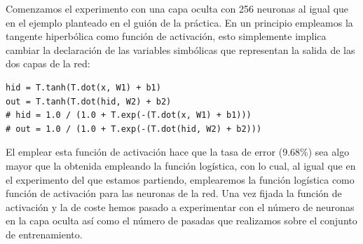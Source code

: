\documentclass[10pt,a4paper]{article}
\begin{document}
Comenzamos el experimento con una capa oculta con 256 neuronas al igual que en el ejemplo planteado en el guión de la práctica. En un principio empleamos la tangente hiperbólica como función de activación, esto simplemente implica cambiar la declaración de las variables simbólicas que representan la salida de las dos capas de la red:

\begin{lstlisting}
hid = T.tanh(T.dot(x, W1) + b1)
out = T.tanh(T.dot(hid, W2) + b2)
# hid = 1.0 / (1.0 + T.exp(-(T.dot(x, W1) + b1)))
# out = 1.0 / (1.0 + T.exp(-(T.dot(hid, W2) + b2)))
\end{lstlisting}

El emplear esta función de activación hace que la tasa de error (9.68\%) sea algo mayor que la obtenida empleando la función logística, con lo cual, al igual que en el experimento del que estamos partiendo, emplearemos la función logística como función de activación para las neuronas de la red. Una vez fijada la función de activación y la de coste hemos pasado a experimentar con el número de neuronas en la capa oculta así como el número de pasadas que realizamos sobre el conjunto de entrenamiento.\\
\end{document}
